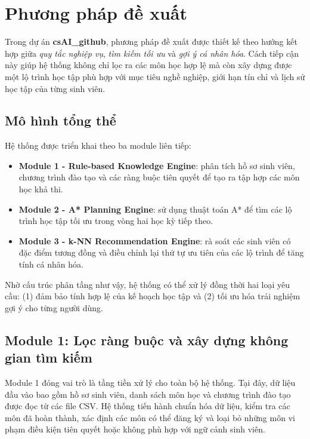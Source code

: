 \section{Phương pháp đề xuất}
\label{sec:phuong_phap_de_xuat}

Trong dự án \textbf{csAI\_github}, phương pháp đề xuất được thiết kế theo hướng kết hợp giữa \textit{quy tắc nghiệp vụ}, \textit{tìm kiếm tối ưu} và \textit{gợi ý cá nhân hóa}. Cách tiếp cận này giúp hệ thống không chỉ lọc ra các môn học hợp lệ mà còn xây dựng được một lộ trình học tập phù hợp với mục tiêu nghề nghiệp, giới hạn tín chỉ và lịch sử học tập của từng sinh viên.

\subsection{Mô hình tổng thể}

Hệ thống được triển khai theo ba module liên tiếp:
\begin{itemize}
    \item \textbf{Module 1 - Rule-based Knowledge Engine}: phân tích hồ sơ sinh viên, chương trình đào tạo và các ràng buộc tiên quyết để tạo ra tập hợp các môn học khả thi.
    \item \textbf{Module 2 - A* Planning Engine}: sử dụng thuật toán A* để tìm các lộ trình học tập tối ưu trong vòng hai học kỳ tiếp theo.
    \item \textbf{Module 3 - k-NN Recommendation Engine}: rà soát các sinh viên có đặc điểm tương đồng và điều chỉnh lại thứ tự ưu tiên của các lộ trình để tăng tính cá nhân hóa.
\end{itemize}

Nhờ cấu trúc phân tầng như vậy, hệ thống có thể xử lý đồng thời hai loại yêu cầu: (1) đảm bảo tính hợp lệ của kế hoạch học tập và (2) tối ưu hóa trải nghiệm gợi ý cho từng người dùng.

\subsection{Module 1: Lọc ràng buộc và xây dựng không gian tìm kiếm}

Module 1 đóng vai trò là tầng tiền xử lý cho toàn bộ hệ thống. Tại đây, dữ liệu đầu vào bao gồm hồ sơ sinh viên, danh sách môn học và chương trình đào tạo được đọc từ các file CSV. Hệ thống tiến hành chuẩn hóa dữ liệu, kiểm tra các môn đã hoàn thành, xác định các môn có thể đăng ký và loại bỏ những môn vi phạm điều kiện tiên quyết hoặc không phù hợp với ngữ cảnh sinh viên.

